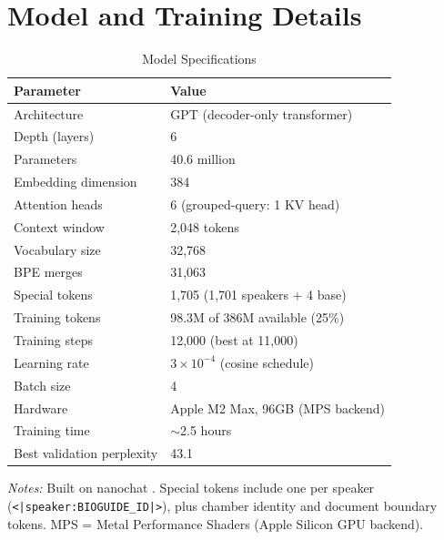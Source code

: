 \documentclass[12pt]{article}
\begin{document}
\section{Model and Training Details}
\label{app:training}

\begin{table}[H]
\centering
\caption{Model Specifications}
\label{tab:model}
\begin{threeparttable}
\begin{tabular}{ll}
\toprule
Parameter & Value \\
\midrule
Architecture & GPT (decoder-only transformer) \\
Depth (layers) & 6 \\
Parameters & 40.6 million \\
Embedding dimension & 384 \\
Attention heads & 6 (grouped-query: 1 KV head) \\
Context window & 2,048 tokens \\
Vocabulary size & 32,768 \\
\quad BPE merges & 31,063 \\
\quad Special tokens & 1,705 (1,701 speakers + 4 base) \\
\midrule
Training tokens & 98.3M of 386M available (25\%) \\
Training steps & 12,000 (best at 11,000) \\
Learning rate & $3 \times 10^{-4}$ (cosine schedule) \\
Batch size & 4 \\
Hardware & Apple M2 Max, 96GB (MPS backend) \\
Training time & $\sim$2.5 hours \\
Best validation perplexity & 43.1 \\
\bottomrule
\end{tabular}
\begin{tablenotes}[flushleft]
\small
\item \textit{Notes:} Built on nanochat \citep{karpathy2025}. Special tokens include one per speaker (\texttt{<|speaker:BIOGUIDE\_ID|>}), plus chamber identity and document boundary tokens. MPS = Metal Performance Shaders (Apple Silicon GPU backend).
\end{tablenotes}
\end{threeparttable}
\end{table}
\end{document}
